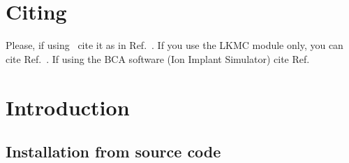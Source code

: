 \section{Citing}

Please, if using \MMonCa\ cite it as in Ref.~\cite{MARTIN-BRAGADO-CPC13}.
If you use the LKMC module only, you can cite Ref.~\cite{MARTIN-BRAGADO-APL11}.
If using the BCA software (Ion Implant Simulator) cite
Ref.~\cite{HERNANDEZ-MANGAS-JAP02}


\section{Introduction}
\subsection{Installation from source code}
